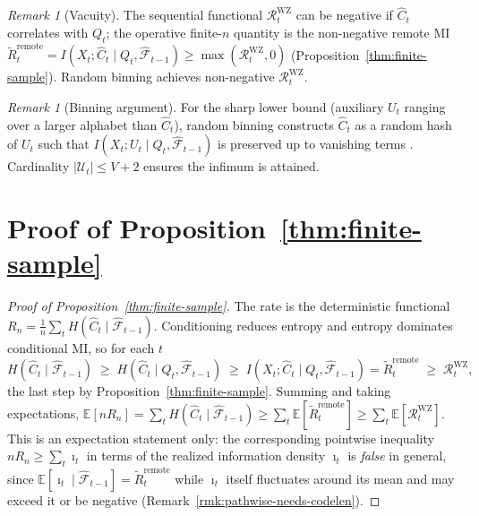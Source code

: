 \documentclass[11pt]{article}
\newcommand{\E}{\mathbb{E}}
\newcommand{\F}{\mathcal{F}}
\newcommand{\Fhat}{\hat{\F}}
\newcommand{\Chat}{\hat{C}}
\theoremstyle{plain}
\theoremstyle{definition}
\theoremstyle{remark}
\newtheorem{remark}[theorem]{Remark}
\begin{document}
\begin{remark}[Vacuity]\label{rmk:vacuity-app}
The sequential functional $\mathcal{R}_t^{\mathrm{WZ}}$ can be negative
if $\Chat_t$ correlates with $Q_t$; the operative finite-$n$ quantity
is the non-negative remote MI
$\widetilde R_t^{\mathrm{remote}} = I(X_t;\Chat_t\mid Q_t,\Fhat_{t-1})
\ge \max(\mathcal{R}_t^{\mathrm{WZ}}, 0)$
(Proposition~\ref{thm:finite-sample}). Random binning achieves
non-negative $\mathcal{R}_t^{\mathrm{WZ}}$.
\end{remark}

\begin{remark}[Binning argument]\label{rmk:binning-app}
For the sharp lower bound (auxiliary $U_t$ ranging over a larger
alphabet than $\Chat_t$), random binning constructs $\Chat_t$ as a
random hash of $U_t$ such that $I(X_t; U_t \mid Q_t, \Fhat_{t-1})$
is preserved up to vanishing terms
\citep[Ch.~11]{elgamal2011network}. Cardinality
$|\mathcal{U}_t| \leq V+2$ ensures the infimum is attained.
\end{remark}

\section{Proof of Proposition~\ref{thm:finite-sample}}\label{app:thm-fs}

\begin{proof}[Proof of Proposition~\ref{thm:finite-sample}]
The rate is the deterministic functional
$R_n = \tfrac1n\sum_t H(\Chat_t\mid\Fhat_{t-1})$. Conditioning reduces
entropy and entropy dominates conditional MI, so for each $t$
\[
H(\Chat_t\mid\Fhat_{t-1})
\;\ge\; H(\Chat_t\mid Q_t,\Fhat_{t-1})
\;\ge\; I(X_t;\Chat_t\mid Q_t,\Fhat_{t-1})
= \widetilde R_t^{\mathrm{remote}}
\;\ge\; \mathcal{R}_t^{\mathrm{WZ}} ,
\]
the last step by Proposition~\ref{thm:finite-sample}. Summing and
taking expectations,
$\E[nR_n] = \sum_t H(\Chat_t\mid\Fhat_{t-1})
\ge \sum_t \E[\widetilde R_t^{\mathrm{remote}}]
\ge \sum_t \E[\mathcal{R}_t^{\mathrm{WZ}}]$.
This is an expectation statement only: the corresponding pointwise
inequality $nR_n \ge \sum_t\imath_t$ in terms of the realized
information density $\imath_t$ is \emph{false} in general, since
$\E[\imath_t\mid\Fhat_{t-1}] = \widetilde R_t^{\mathrm{remote}}$ while
$\imath_t$ itself fluctuates around its mean and may exceed it or be
negative (Remark~\ref{rmk:pathwise-needs-codelen}).
\end{proof}
\end{document}
